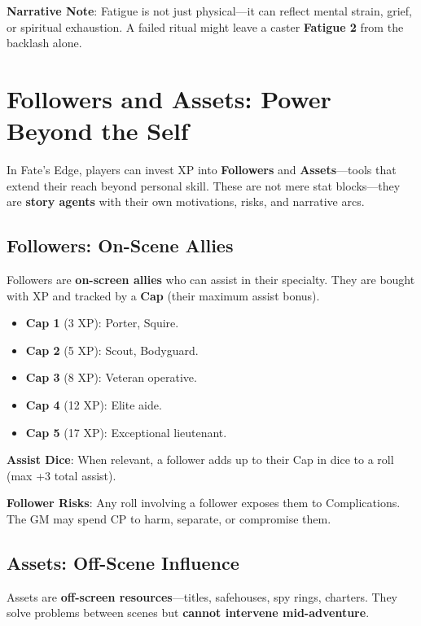 \textbf{Narrative Note}: Fatigue is not just physical—it can reflect mental strain, grief, or spiritual exhaustion. A failed ritual might leave a caster \textbf{Fatigue 2} from the backlash alone.

\section*{Followers and Assets: Power Beyond the Self}

In Fate’s Edge, players can invest XP into \textbf{Followers} and \textbf{Assets}—tools that extend their reach beyond personal skill. These are not mere stat blocks—they are \textbf{story agents} with their own motivations, risks, and narrative arcs.

\subsection*{Followers: On-Scene Allies}

Followers are \textbf{on-screen allies} who can assist in their specialty. They are bought with XP and tracked by a \textbf{Cap} (their maximum assist bonus).

\begin{itemize}
    \item \textbf{Cap 1} (3 XP): Porter, Squire.
    \item \textbf{Cap 2} (5 XP): Scout, Bodyguard.
    \item \textbf{Cap 3} (8 XP): Veteran operative.
    \item \textbf{Cap 4} (12 XP): Elite aide.
    \item \textbf{Cap 5} (17 XP): Exceptional lieutenant.
\end{itemize}

\textbf{Assist Dice}: When relevant, a follower adds up to their Cap in dice to a roll (max +3 total assist).

\textbf{Follower Risks}: Any roll involving a follower exposes them to Complications. The GM may spend CP to harm, separate, or compromise them.

\subsection*{Assets: Off-Scene Influence}

Assets are \textbf{off-screen resources}—titles, safehouses, spy rings, charters. They solve problems between scenes but \textbf{cannot intervene mid-adventure}.

